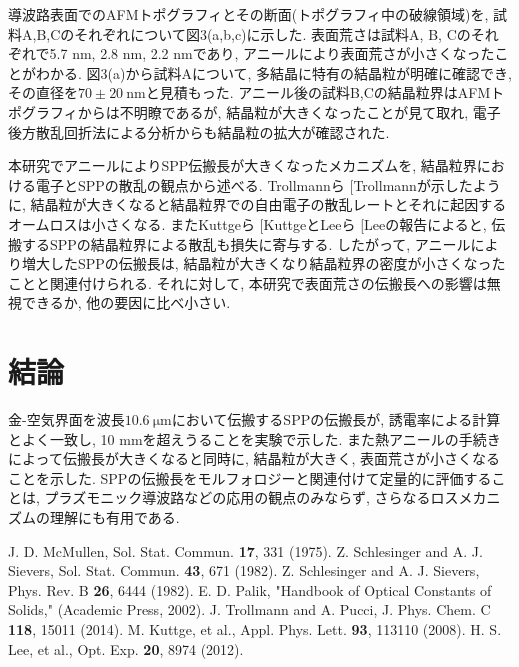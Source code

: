 \documentclass[a4,10truept]{jsarticle}
\makeatletter
\DeclareRobustCommand\cite{\unskip
\@ifnextchar[{\@tempswatrue\@citex}{\@tempswafalse\@citex[]}}
\makeatother
\begin{document}
導波路表面でのAFMトポグラフィとその断面(トポグラフィ中の破線領域)を, 試料A,B,Cのそれぞれについて図3(a,b,c)に示した. 表面荒さは試料A, B, Cのそれぞれで5.7 nm, 2.8 nm, 2.2 nmであり, アニールにより表面荒さが小さくなったことがわかる. 図3(a)から試料Aについて, 多結晶に特有の結晶粒が明確に確認でき, その直径を$70\pm20\:\mathrm{nm}$と見積もった. アニール後の試料B,Cの結晶粒界はAFMトポグラフィからは不明瞭であるが, 結晶粒が大きくなったことが見て取れ, 電子後方散乱回折法による分析からも結晶粒の拡大が確認された. 

本研究でアニールによりSPP伝搬長が大きくなったメカニズムを, 結晶粒界における電子とSPPの散乱の観点から述べる. Trollmannら\cite{Trollmann}が示したように, 結晶粒が大きくなると結晶粒界での自由電子の散乱レートとそれに起因するオームロスは小さくなる. またKuttgeら\cite{Kuttge}とLeeら\cite{Lee}の報告によると, 伝搬するSPPの結晶粒界による散乱も損失に寄与する. したがって, アニールにより増大したSPPの伝搬長は, 結晶粒が大きくなり結晶粒界の密度が小さくなったことと関連付けられる. それに対して, 本研究で表面荒さの伝搬長への影響は無視できるか, 他の要因に比べ小さい. 

\vspace{-0.2em}
\section{結論}
\vspace{-0.5em}
金-空気界面を波長$10.6\:\mathrm{\mu m}$において伝搬するSPPの伝搬長が, 誘電率による計算とよく一致し, 10 mmを超えうることを実験で示した. また熱アニールの手続きによって伝搬長が大きくなると同時に, 結晶粒が大きく, 表面荒さが小さくなることを示した. SPPの伝搬長をモルフォロジーと関連付けて定量的に評価することは, プラズモニック導波路などの応用の観点のみならず, さらなるロスメカニズムの理解にも有用である. 

%
%
\vspace{-0.2em}
\begin{thebibliography}{9}
\vspace{-0.5em}
 J. D. McMullen, Sol. Stat. Commun. {\bf 17}, 331 (1975).
 Z. Schlesinger and A. J. Sievers, Sol. Stat. Commun. {\bf 43}, 671 (1982).
 Z. Schlesinger and A. J. Sievers, Phys. Rev. B {\bf 26}, 6444 (1982).
 E. D. Palik, "Handbook of Optical Constants of Solids," (Academic Press, 2002).
 J. Trollmann and A. Pucci, J. Phys. Chem. C {\bf 118}, 15011 (2014).
 M. Kuttge, et al., Appl. Phys. Lett. {\bf 93}, 113110 (2008).
 H. S. Lee, et al., Opt. Exp. {\bf 20}, 8974 (2012).
\end{thebibliography}
\end{document}
